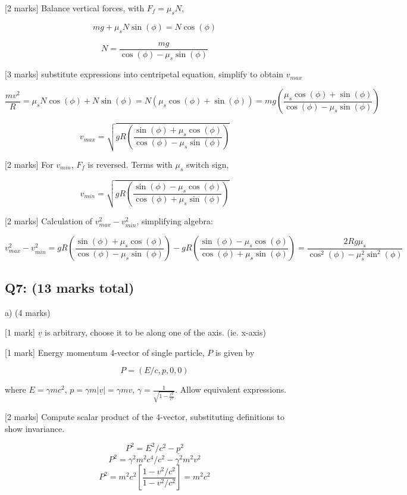 \documentclass[a4paper,11pt]{article}
\begin{document}
[2 marks] Balance vertical forces, with \( F_f = \mu_s N \),

\[ mg + \mu_s N \sin(\phi) = N \cos(\phi) \]

\[ N = \frac{mg}{\cos(\phi) - \mu_s \sin(\phi)} \]

[3 marks] substitute expressions into centripetal equation, simplify to obtain \( v_{max} \)

\[ \frac{m v^2}{R} = \mu_s N \cos(\phi) + N \sin(\phi) = N (\mu_s \cos(\phi) + \sin(\phi) ) = mg \left ( \frac{\mu_s \cos(\phi) + \sin(\phi)}{ \cos(\phi) - \mu_s \sin(\phi)} \right ) \]

\[ v_{max} = \sqrt{gR \left ( \frac{\sin(\phi) + \mu_s \cos(\phi)}{\cos(\phi) - \mu_s \sin(\phi)} \right )}  \]

[2 marks] For \( v_{min} \), \(F_f\) is reversed. Terms with \( \mu_s \) switch sign, 

\[ v_{min} = \sqrt{gR \left ( \frac{\sin(\phi) - \mu_s \cos(\phi)}{\cos(\phi) + \mu_s \sin(\phi)} \right )} \]

[2 marks] Calculation of \( v_{max}^{2} - v_{min}^{2} \), simplifying algebra:

\[ v_{max}^{2} - v_{min}^{2} = gR \left ( \frac{\sin(\phi) + \mu_s \cos(\phi)}{\cos(\phi) - \mu_s \sin(\phi)} \right ) - gR \left ( \frac{\sin(\phi) - \mu_s \cos(\phi)}{\cos(\phi) + \mu_s \sin(\phi)} \right ) = \frac{2Rg\mu_{s}}{\cos^{2}(\phi) - \mu_{s}^{2}\sin^{2}(\phi)} \]

\subsection*{Q7: (13 marks total)}

a) (4 marks)

[1 mark] \( \underline{v} \) is arbitrary, choose it to be along one of the axis. (ie. x-axis)

[1 mark] Energy momentum 4-vector of single particle, \( P \) is given by 

\[ P = ( E / c, p, 0, 0 ) \]

where \( E = \gamma m c^2 \), \( p = \gamma m | \underline{v} | = \gamma mv \), \( \gamma = \frac{1}{\sqrt{1-\frac{v^2}{c^2}}} \). Allow equivalent expressions.

[2 marks] Compute scalar product of the 4-vector, substituting definitions to show invariance.

\[ P^2 = E^2 / c^2 - \underline{p}^2 \]
\[ P^2 = \gamma^2 m^2 c^4 / c^2 - \gamma ^2 m^2 v^2 \]
\[ P^2 = m^2 c^2 \left [ \frac{1-v^2/c^2}{1-v^2/c^2} \right] = m^2c^2 \]
\end{document}
